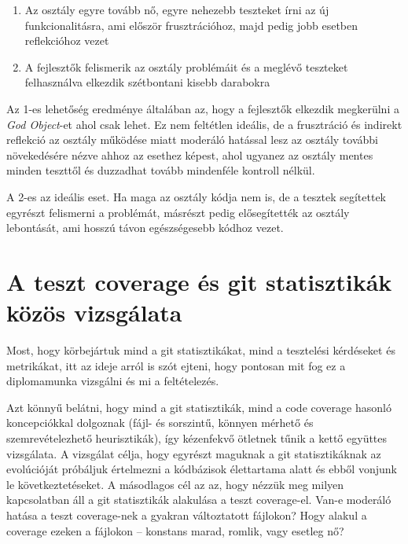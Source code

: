 \begin{enumerate}
    \item Az osztály egyre tovább nő, egyre nehezebb teszteket írni az új funkcionalitásra, ami először frusztrációhoz, majd pedig jobb esetben reflekcióhoz vezet
    \item A fejlesztők felismerik az osztály problémáit és a meglévő teszteket felhasználva elkezdik szétbontani kisebb darabokra
\end{enumerate}

Az 1-es lehetőség eredménye általában az, hogy a fejlesztők elkezdik megkerülni a \textit{God Object}-et ahol csak lehet. Ez nem feltétlen ideális, de a frusztráció és indirekt reflekció az osztály működése miatt moderáló hatással lesz az osztály további növekedésére nézve ahhoz az esethez képest, ahol ugyanez az osztály mentes minden teszttől és duzzadhat tovább mindenféle kontroll nélkül.

A 2-es az ideális eset. Ha maga az osztály kódja nem is, de a tesztek segítettek egyrészt felismerni a problémát, másrészt pedig elősegítették az osztály lebontását, ami hosszú távon egészségesebb kódhoz vezet.

\section{A teszt coverage és git statisztikák közös vizsgálata}

Most, hogy körbejártuk mind a git statisztikákat, mind a tesztelési kérdéseket és metrikákat, itt az ideje arról is szót ejteni, hogy pontosan mit fog ez a diplomamunka vizsgálni és mi a feltételezés.

Azt könnyű belátni, hogy mind a git statisztikák, mind a code coverage hasonló koncepciókkal dolgoznak (fájl- és sorszintű, könnyen mérhető és szemrevételezhető heurisztikák), így kézenfekvő ötletnek tűnik a kettő együttes vizsgálata. A vizsgálat célja, hogy egyrészt maguknak a git statisztikáknak az evolúcióját próbáljuk értelmezni a kódbázisok élettartama alatt és ebből vonjunk le következtetéseket. A másodlagos cél az az, hogy nézzük meg milyen kapcsolatban áll a git statisztikák alakulása a teszt coverage-el. Van-e moderáló hatása a teszt coverage-nek a gyakran változtatott fájlokon? Hogy alakul a coverage ezeken a fájlokon -- konstans marad, romlik, vagy esetleg nő?


